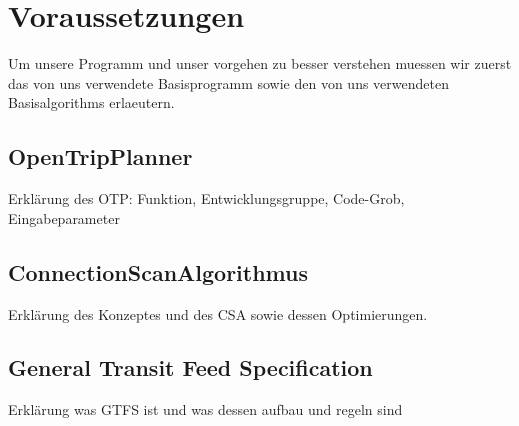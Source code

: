 \section{Voraussetzungen}
Um unsere Programm und unser vorgehen zu besser verstehen muessen wir zuerst das von uns verwendete Basisprogramm sowie den von uns verwendeten Basisalgorithms erlaeutern.

\subsection{OpenTripPlanner}
Erklärung des OTP: Funktion, Entwicklungsgruppe, Code-Grob, Eingabeparameter

\subsection{ConnectionScanAlgorithmus}
Erklärung des Konzeptes und des CSA sowie dessen Optimierungen. 

\subsection{General Transit Feed Specification}
Erklärung was GTFS ist und was dessen aufbau und regeln sind